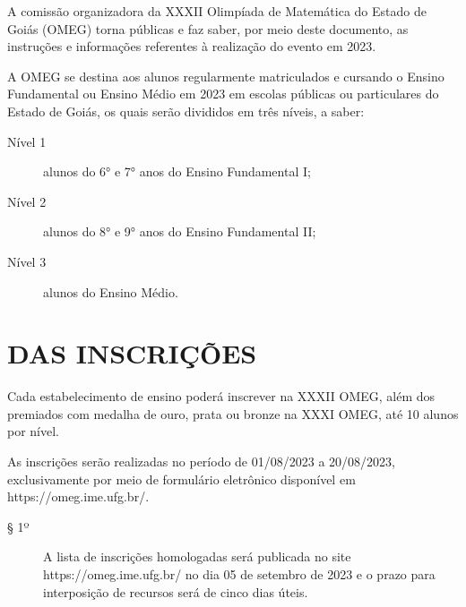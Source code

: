 A comissão organizadora da XXXII Olimpíada de Matemática do Estado de Goiás
(OMEG) torna públicas e faz saber, por meio deste documento, as instruções e
informações referentes à realização do evento em 2023.

\begin{article}
  A OMEG se destina aos alunos regularmente matriculados e cursando o Ensino
  Fundamental ou Ensino Médio em 2023 em escolas públicas ou particulares do
  Estado de Goiás, os quais serão divididos em três níveis, a saber:
  \begin{description}
    \item[Nível 1] alunos do 6° e 7° anos do Ensino Fundamental I;
    \item[Nível 2] alunos do 8° e 9° anos do Ensino Fundamental II;
    \item[Nível 3] alunos do Ensino Médio.
  \end{description}
\end{article}

\section{DAS INSCRIÇÕES}

\begin{article}
  Cada estabelecimento de ensino poderá inscrever na XXXII OMEG, além dos
  premiados com medalha de ouro, prata ou bronze na XXXI OMEG, até 10
  alunos por nível.
\end{article}

\begin{article}
  As inscrições serão realizadas no período de 01/08/2023 a 20/08/2023,
  exclusivamente por meio de formulário eletrônico disponível em
  https://omeg.ime.ufg.br/.
  \begin{description}
    \item[§ 1º]
      A lista de inscrições homologadas será publicada no site
      https://omeg.ime.ufg.br/ no dia 05 de setembro de 2023 e o prazo para
      interposição de recursos será de cinco dias úteis.
  \end{description}
\end{article}

